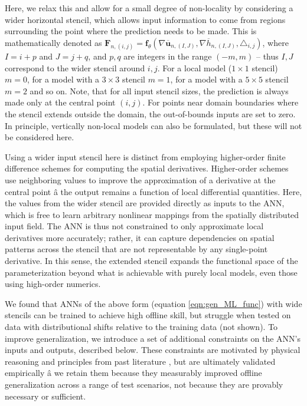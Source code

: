 \documentclass[draft]{agujournal2019}
\begin{document}
Here, we relax this and allow for a small degree of non-locality by considering a wider horizontal stencil, which allows input information to come from regions surrounding the point where the prediction needs to be made.
This is mathematically denoted as 
$\mathbf{F}_{n,(i,j)} = \mathbf{f}_{\theta}(\nabla \overline{\mathbf{u}}_{n,(I,J)}, \nabla \overline{h}_{n,(I,J)}, \triangle_{i,j})$, 
where $I=i+p$ and  $J=j+ q$, and $p,q$ are integers in the range $(-m,m)$ -- thus $I,J$ correspond to the wider stencil around $i,j$.
For a local model ($1\times1$ stencil) $m=0$, for a model with a $3\times3$ stencil $m=1$, for a model with a $5\times5$ stencil $m=2$ and so on. Note, that for all input stencil sizes, the prediction is always made only at the central point $(i,j)$. For points near domain boundaries where the stencil extends outside the domain, the out-of-bounds inputs are set to zero.
In principle, vertically non-local models can also be formulated, but these will not be considered here.

Using a wider input stencil here is distinct from employing higher-order finite difference schemes for computing the spatial derivatives. Higher-order schemes use neighboring values to improve the approximation of a derivative at the central point â the output remains a function of local differential quantities. Here, the values from the wider stencil are provided directly as inputs to the ANN, which is free to learn arbitrary nonlinear mappings from the spatially distributed input field. The ANN is thus not constrained to only approximate local derivatives more accurately; rather, it can capture dependencies on spatial patterns across the stencil that are not representable by any single-point derivative. In this sense, the extended stencil expands the functional space of the parameterization beyond what is achievable with purely local models, even those using high-order numerics.

We found that ANNs of the above form (equation \ref{eqn:gen_ML_func}) with wide stencils can be trained to achieve high offline skill, but struggle when tested on data with distributional shifts relative to the training data (not shown). To improve generalization, we introduce a set of additional constraints on the ANN's inputs and outputs, described below. These constraints are motivated by physical reasoning and principles from past literature \cite{beucler2021climate, perezhogin2025generalizable}, but are ultimately validated empirically â we retain them because they measurably improved offline generalization across a range of test scenarios, not because they are provably necessary or sufficient.
\end{document}
